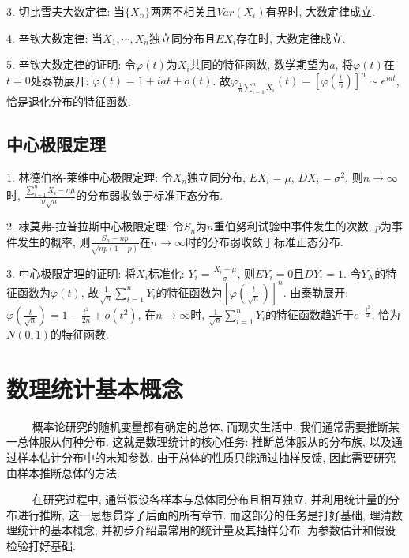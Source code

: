 3. 切比雪夫大数定律: 当$\{X_n\}$两两不相关且$Var(X_i)$有界时, 大数定律成立.

4. 辛钦大数定律: 当$X_1,\cdots,X_n$独立同分布且$EX_i$存在时, 大数定律成立.

5. 辛钦大数定律的证明: 令$\varphi(t)$为$X_i$共同的特征函数, 数学期望为$a$, 将$\varphi(t)$在$t=0$处泰勒展开: $\varphi(t)=1+iat+o(t)$. 
故$\varphi_{\frac{1}{n}\sum\limits_{i=1}^n X_i}(t)=\left[\varphi\left(\frac{t}{n}\right)\right]^n \sim e^{iat}$, 恰是退化分布的特征函数.

\subsection{中心极限定理}

1. 林德伯格-莱维中心极限定理: 令$X_n$独立同分布, $EX_i=\mu$, $DX_i=\sigma^2$, 则$n\rightarrow \infty$时, $\frac{\sum\limits_{i-1}^n X_i-n\mu}{\sigma\sqrt{n}}$的分布弱收敛于标准正态分布.

2. 棣莫弗-拉普拉斯中心极限定理: 令$S_n$为$n$重伯努利试验中事件发生的次数, $p$为事件发生的概率, 则$\frac{S_n-np}{\sqrt{np(1-p)}}$在$n\rightarrow \infty$时的分布弱收敛于标准正态分布.

3. 中心极限定理的证明: 将$X_i$标准化: $Y_i=\frac{X_i-\mu}{\sigma}$, 则$EY_i=0$且$DY_i=1$. 令$Y_N$的特征函数为$\varphi(t)$, 故$\frac{1}{\sqrt{n}}\sum\limits_{i=1}^n Y_i$的特征函数为$\left[\varphi\left(\frac{t}{\sqrt{n}}\right)\right]^n$.
由泰勒展开: $\varphi\left(\frac{t}{\sqrt{n}}\right)=1-\frac{t^2}{2n}+o(t^2)$, 在$n\rightarrow \infty $时, $\frac{1}{\sqrt{n}}\sum\limits_{i=1}^n Y_i$的特征函数趋近于$e^{-\frac{t^2}{2}}$, 恰为$N(0,1)$的特征函数.

\section{数理统计基本概念}


\begin{tcolorbox}[colback=red!5,colframe=red!75!black]
    ~~~~ 概率论研究的随机变量都有确定的总体, 而现实生活中, 我们通常需要推断某一总体服从何种分布. 这就是数理统计的核心任务: 推断总体服从的分布族, 以及通过样本估计分布中的未知参数. 
    由于总体的性质只能通过抽样反馈, 因此需要研究由样本推断总体的方法. 

    ~~~~ 在研究过程中, 通常假设各样本与总体同分布且相互独立, 并利用统计量的分布进行推断, 这一思想贯穿了后面的所有章节. 而这部分的任务是打好基础, 理清数理统计的基本概念, 并初步介绍最常用的统计量及其抽样分布, 为参数估计和假设检验打好基础. 
\end{tcolorbox}


